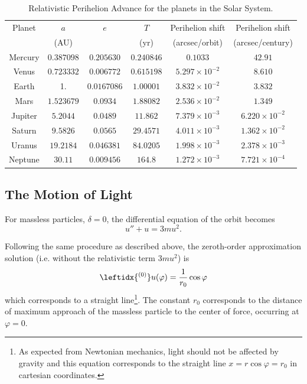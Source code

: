\begin{table}[h]
\centering
\footnotesize
\begin{tabular}{|c|c|c|c|c|c|}
\hline
Planet & $a$ & $e$ & $T$ & Perihelion shift & Perihelion shift \\
 & (AU) & & (yr) & { (arcsec/orbit)}  & { (arcsec/century)}  \\
\hline
Mercury & $0.387098$ & $0.205630$ & $0.240846$ & $0.1033$ & $42.91$ \\
Venus & $0.723332$ & $0.006772$ & $0.615198$ & $5.297 \times 10^{-2}$ & $8.610$ \\
Earth & 1. & $0.0167086$ & $1.00001$ & $3.832\times 10^{-2}$ & $3.832$ \\
Mars & $1.523679$ &  $0.0934$ & $1.88082$ & $2.536\times 10^{-2}$ & $1.349$\\
Jupiter	 & $5.2044$ & $0.0489$ & $11.862$ & $7.379\times 10^{-3}$ & $6.220\times 10^{-2}$\\
Saturn	& $9.5826$ & $0.0565$ & $29.4571$ & $4.011\times 10^{-3}$ & $1.362\times 10^{-2}$\\
Uranus & $19.2184$ & $0.046381$ & $84.0205$ & $1.998\times 10^{-3}$ & $2.378\times 10^{-3}$\\
Neptune & $30.11$ & $0.009456$ & $164.8$ & $1.272\times 10^{-3}$ & $7.721\times 10^{-4}$\\
\hline
\end{tabular}
\caption{Relativistic Perihelion Advance for the planets in the Solar System.}
\label{tab:RelativisticPerihelionShift}
\end{table}

\subsection{The Motion of Light}
For massless particles, $\delta=0$, the differential equation of the orbit becomes
\begin{equation}
u'' + u = 3mu^2 .\label{eq:DiffEoMMassless}
\end{equation}

Following the same procedure as described above, the zeroth-order approximation solution (i.e. without the relativistic term $3mu^2$) is
\begin{equation}
\leftidx{^{(0)}} u (\varphi) = \frac{1}{r_0} \cos \varphi
\end{equation}
which corresponds to a straight line\footnote{As expected from Newtonian mechanics, light should not be affected by gravity and this equation corresponds to the straight line $x=r\cos \varphi =r_0$ in cartesian coordinates.}. The constant $r_0$ corresponds to the distance of maximum approach of the massless particle to the center of force, occurring at $\varphi = 0$.

